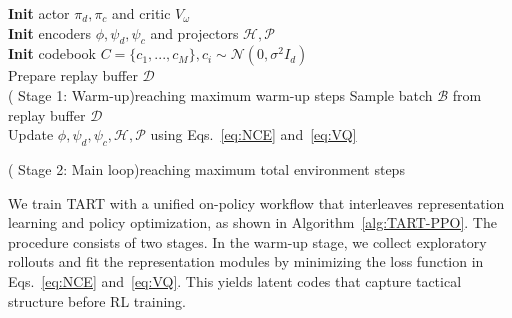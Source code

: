 \begin{algorithm}[t!]
	\small
	\textbf{Init} actor $\pi_d, \pi_c$ and critic $V_{\omega}$\\
	\textbf{Init} encoders $\phi, \psi_d, \psi_c$ and projectors $\mathcal{H}, \mathcal{P}$\\
        \textbf{Init} codebook $C=\{c_1, ..., c_M\}, c_i \sim \mathcal{N}(0, \sigma^2I_d)$\\
	Prepare replay buffer $\mathcal{D}$\\
	\Repeat( Stage 1: Warm-up){reaching maximum warm-up steps}{
        Sample batch $\mathcal{B}$ from replay buffer $\mathcal{D}$\\
		Update $\phi, \psi_d, \psi_c, \mathcal{H}, \mathcal{P}$ using Eqs.~\eqref{eq:NCE} and~\eqref{eq:VQ}\\
	}
	
	\Repeat( Stage 2: Main loop){reaching maximum total environment steps}{
		
        }
	\caption{TART-PPO}
	\label{alg:TART-PPO}
\end{algorithm}

We train TART with a unified on-policy workflow that interleaves representation learning and policy optimization, as shown in Algorithm~\ref{alg:TART-PPO}. 
The procedure consists of two stages.
In the warm-up stage, we collect exploratory rollouts and fit the representation modules by minimizing the loss function in Eqs.~\eqref{eq:NCE} and~\eqref{eq:VQ}.
This yields latent codes that capture tactical structure before RL training.

